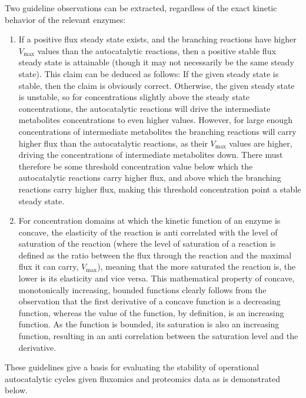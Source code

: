     Two guideline observations can be extracted, regardless of the exact kinetic behavior of the relevant enzymes:
    \begin{enumerate}
        \item If a positive flux steady state exists, and the branching reactions have higher $V_{\max}$ values than the autocatalytic reactions, then a positive stable flux steady state is attainable (though it may not necessarily be the same steady state).
        This claim can be deduced as follows:
        If the given steady state is stable, then the claim is obviously correct.
        Otherwise, the given steady state is unstable, so for concentrations slightly above the steady state concentrations, the autocatalytic reactions will drive the intermediate metabolites concentrations to even higher values.
        However, for large enough concentrations of intermediate metabolites the branching reactions will carry higher flux than the autocatalytic reactions, as their $V_{\max}$ values are higher, driving the concentrations of intermediate metabolites down.
        There must therefore be some threshold concentration value below which the autocatalytic reactions carry higher flux, and above which the branching reactions carry higher flux, making this threshold concentration point a stable steady state.
    \item For concentration domains at which the kinetic function of an enzyme is concave, the elasticity of the reaction is anti correlated with the level of saturation of the reaction (where the level of saturation of a reaction is defined as the ratio between the flux through the reaction and the maximal flux it can carry, $V_{\max}$), meaning that the more saturated the reaction is, the lower is its elasticity and vice versa.
          This mathematical property of concave, monotonically increasing, bounded functions clearly follows from the observation that the first derivative of a concave function is a decreasing function, whereas the value of the function, by definition, is an increasing function. 
          As the function is bounded, its saturation is also an increasing function, resulting in an anti correlation between the saturation level and the derivative.
    \end{enumerate}

    These guidelines give a basis for evaluating the stability of operational autocatalytic cycles given fluxomics and proteomics data as is demonstrated below.

